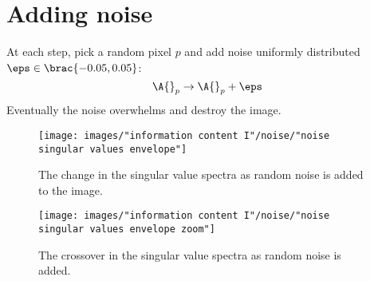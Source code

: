 \section{Adding noise}
At each step, pick a random pixel $p$ and add noise uniformly distributed $\eps\in\brac{-0.05,0.05}$:
%
\begin{equation}
  \A{}_{p} \to \A{}_{p} + \eps
\end{equation}
%
Eventually the noise overwhelms and destroy the image.

\begin{figure}[htbp] %
   \centering
   \texttt{[image: images/"information content I"/noise/"noise singular values envelope"]} 
   \caption[The change in the singular value spectra as random noise is added to the image]{The change in the singular value spectra as random noise is added to the image.}
   \label{fig:noise:spectra}
\end{figure}

\begin{figure}[htbp] %
   \centering
   \texttt{[image: images/"information content I"/noise/"noise singular values envelope zoom"]} 
   \caption[The crossover in the singular value spectra as random noise is added]{The crossover in the singular value spectra as random noise is added.}
   \label{fig:noise:spectra zoom}
\end{figure}



\endinput